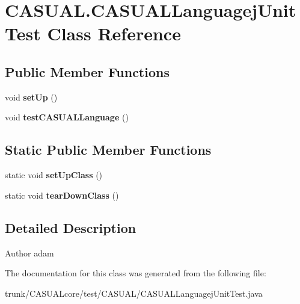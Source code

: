 \hypertarget{class_c_a_s_u_a_l_1_1_c_a_s_u_a_l_languagej_unit_test}{\section{C\-A\-S\-U\-A\-L.\-C\-A\-S\-U\-A\-L\-Languagej\-Unit\-Test Class Reference}
\label{class_c_a_s_u_a_l_1_1_c_a_s_u_a_l_languagej_unit_test}
}
\subsection*{Public Member Functions}
\begin{DoxyCompactItemize}
\item 
\hypertarget{class_c_a_s_u_a_l_1_1_c_a_s_u_a_l_languagej_unit_test_abaa6894fbf73e0fb8468dbc9106c1840}{void {\bfseries set\-Up} ()}\label{class_c_a_s_u_a_l_1_1_c_a_s_u_a_l_languagej_unit_test_abaa6894fbf73e0fb8468dbc9106c1840}

\item 
\hypertarget{class_c_a_s_u_a_l_1_1_c_a_s_u_a_l_languagej_unit_test_ac33eddf034afaaf970e098b0d781373e}{void {\bfseries test\-C\-A\-S\-U\-A\-L\-Language} ()}\label{class_c_a_s_u_a_l_1_1_c_a_s_u_a_l_languagej_unit_test_ac33eddf034afaaf970e098b0d781373e}

\end{DoxyCompactItemize}
\subsection*{Static Public Member Functions}
\begin{DoxyCompactItemize}
\item 
\hypertarget{class_c_a_s_u_a_l_1_1_c_a_s_u_a_l_languagej_unit_test_a492ae1dc59999557c58c72065d7981fa}{static void {\bfseries set\-Up\-Class} ()}\label{class_c_a_s_u_a_l_1_1_c_a_s_u_a_l_languagej_unit_test_a492ae1dc59999557c58c72065d7981fa}

\item 
\hypertarget{class_c_a_s_u_a_l_1_1_c_a_s_u_a_l_languagej_unit_test_a30a633e5ef6562da3a428183f89f52f0}{static void {\bfseries tear\-Down\-Class} ()}\label{class_c_a_s_u_a_l_1_1_c_a_s_u_a_l_languagej_unit_test_a30a633e5ef6562da3a428183f89f52f0}

\end{DoxyCompactItemize}


\subsection{Detailed Description}
\begin{DoxyAuthor}{Author}
adam 
\end{DoxyAuthor}


The documentation for this class was generated from the following file\-:\begin{DoxyCompactItemize}
\item 
trunk/\-C\-A\-S\-U\-A\-Lcore/test/\-C\-A\-S\-U\-A\-L/C\-A\-S\-U\-A\-L\-Languagej\-Unit\-Test.\-java\end{DoxyCompactItemize}
